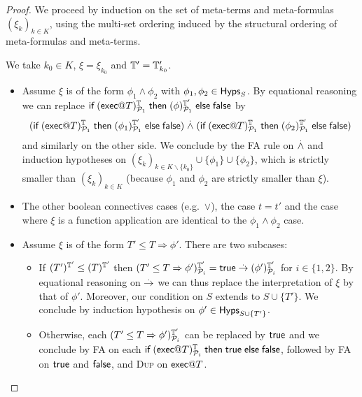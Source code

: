 \begin{proof}
  We proceed by induction on the set of meta-terms and meta-formulas $(\xi_k)_{k \in K}$, using the multi-set ordering induced by the structural ordering of meta-formulas and meta-terms.

  We take $k_0 \in K$, $\xi = \xi_{k_0}$ and $\mathbb{T}' = \mathbb{T}'_{k_0}$.
  \begin{itemize}
    \item Assume $\xi$ is of the form $\phi_1\wedge\phi_2$ with
      $\phi_1,\phi_2\in \textsf{Hyps}_S$. By equational reasoning we can replace
      $\textsf{if}\; (\textsf{exec} @ T)^{\mathbb{T}}_{\mathcal{P}_1}
      \;\textsf{then}\; (\phi)^{\mathbb{T}'}_{\mathcal{P}_1} \;\textsf{else}\; \textsf{false}$
      by
      \[
        (\textsf{if}\; (\textsf{exec} @ T)^{\mathbb{T}}_{\mathcal{P}_1}
        \;\textsf{then}\; (\phi_1)^{\mathbb{T}'}_{\mathcal{P}_1} \;\textsf{else}\; \textsf{false})
        \stackrel{.}{\wedge}
        (\textsf{if}\; (\textsf{exec} @ T)^{\mathbb{T}}_{\mathcal{P}_1}
        \;\textsf{then}\; (\phi_2)^{\mathbb{T}'}_{\mathcal{P}_1} \;\textsf{else}\; \textsf{false})
      \]
      and similarly on the other side.
      We conclude by the \textsc{FA} rule on $\stackrel{.}{\wedge}$ and induction
      hypotheses on
      $(\xi_k)_{k \in K \backslash \{k_0\}} \cup \{\phi_1\} \cup \{\phi_2\}$,
      which is strictly smaller than $(\xi_k)_{k \in K}$ (because $\phi_1$ and $\phi_2$ are strictly smaller than $\xi$).

   \item The other boolean connectives cases (e.g.\ $\vee$), the case $t = t'$ and the case where $\xi$ is a function application are identical to the $\phi_1\wedge\phi_2$ case. 
     
   \item Assume $\xi$ is of the form $T' \leq T \Rightarrow \phi'$.
     There are two subcases:
     \begin{itemize}
       \item If $(T')^{\mathbb{T}'}_{} \leq (T)^{\mathbb{T}'}_{}$ then
         $(T' \leq T \Rightarrow \phi')^{\mathbb{T}'}_{\mathcal{P}_i} =
         \textsf{true} \stackrel{.}{\rightarrow} (\phi')^{\mathbb{T}'}_{\mathcal{P}_i}$ for $i\in \{1,2\}$.
         By equational reasoning on $\stackrel{.}{\rightarrow}$ we can thus replace
         the interpretation of $\xi$ by that of $\phi'$.
         Moreover, our condition on $S$ extends to $S \cup \{T'\}$.
         We conclude by induction hypothesis on
         $\phi' \in \textsf{Hyps}_{S\cup\{T'\}}$.
       \item Otherwise, each
         $(T' \leq T \Rightarrow \phi')^{\mathbb{T}'}_{\mathcal{P}_i}$ can be
         replaced by $\textsf{true}$ and we conclude by \textsc{FA}
         on each $\textsf{if}\; (\textsf{exec} @ T)^{\mathbb{T}}_{\mathcal{P}_i} \;\textsf{then}\; \textsf{true}
         \;\textsf{else}\; \textsf{false}$, followed
         by \textsc{FA} on $\textsf{true}$ and $\textsf{false}$,
         and \textsc{Dup} on $\textsf{exec} @ T$.
     \end{itemize}


\end{itemize}
\end{proof}

